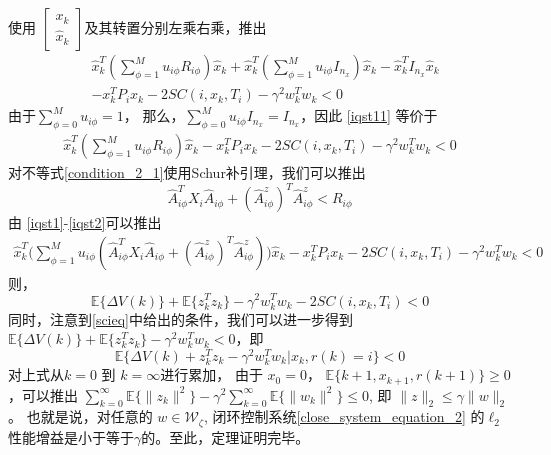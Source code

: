	使用 $\begin{bmatrix}
	x_{k}\\
	\hat{x}_{k}
	\end{bmatrix}$及其转置分别左乘右乘，推出
	\begin{equation} \label{iqst11}
	\begin{split}
	&\hat{x}^{T}_{k}(\sum_{\phi=1}^{M}u_{i\phi}R_{i\phi})\hat{x}_k+ \hat{x}^{T}_{k}(\sum_{\phi=1}^{M}u_{i\phi}I_{n_{x}})\hat{x}_{k}-\hat{x}^{T}_{k}I_{n_{x}}\hat{x}_{k}\\
	&-x^{T}_{k}P_{i}x_{k}-2SC(i,x_k,T_i)-\gamma^{2}w^{T}_{k}w_{k}<0
	\end{split}
	\end{equation}
	由于$\sum_{\phi=0}^{M}u_{i\phi}=1$， 那么，$\sum_{\phi=0}^{M}u_{i\phi}I_{n_x}=I_{n_x}$，因此 \eqref{iqst11} 等价于
	\begin{equation} \label{iqst1}
	\begin{split}
	\hat{x}^{T}_{k}(\sum_{\phi=1}^{M}u_{i\phi}R_{i\phi})\hat{x}_k-x^{T}_{k}P_{i}x_{k}-2SC(i,x_k,T_i)-\gamma^{2}w^{T}_{k}w_{k}<0
	\end{split}
	\end{equation}
	对不等式\eqref{condition_2_1}使用Schur补引理，我们可以推出
	\begin{equation} \label{iqst2}
	\hat{A}^{T}_{i\phi}X_{i}\hat{A}_{i\phi}+(\hat{A}^{z}_{i\phi})^{T}\hat{A}^{z}_{i\phi}<R_{i\phi}
	\end{equation}
	由 \eqref{iqst1}-\eqref{iqst2}可以推出
	\begin{equation} \label{leq222}
	\begin{split}
	\hat{x}^{T}_{k}\Big(\sum_{\phi=1}^{M}u_{i\phi}(\hat{A}^{T}_{i\phi}X_{i}\hat{A}_{i\phi}+(\hat{A}^{z}_{i\phi})^{T}\hat{A}^{z}_{i\phi})\Big)\hat{x}_k-x^{T}_{k}P_{i}x_{k}  -2SC(i,x_k,T_i)-\gamma^{2}w^{T}_{k}w_{k}<0
	\end{split}
	\end{equation}
	则， 
	\begin{equation} \label{eq31}
	\mathbb{E}\{\varDelta V(k)\}+\mathbb{E}\{z^{T}_{k}z_{k}\}-\gamma^{2}w^{T}_{k}w_{k}-2SC(i,x_k,T_i)<0
	\end{equation}
	同时，注意到\eqref{scieq}中给出的条件，我们可以进一步得到$\mathbb{E}\{\varDelta V(k)\}+\mathbb{E}\{z^{T}_{k}z_{k}\}-\gamma^{2}w^{T}_{k}w_{k}<0$，即
	\begin{equation}
	\mathbb{E}\{\varDelta V(k)+z^{T}_{k}z_{k}-\gamma^{2}w^{T}_{k}w_{k}|x_{k},r(k)=i \}<0
	\end{equation}
	对上式从$k=0$ 到 $k=\infty$进行累加， 由于 $x_{0} =0$， $\mathbb{E}\{k+1,x_{k+1},r(k+1)\}\geq0 $，可以推出 $\sum_{k=0}^{\infty}\mathbb{E}\{ \|z_{k}\|^{2} \}-\gamma^{2}\sum_{k=0}^{\infty}\mathbb{E}\{\|w_{k}\|^{2}\}\leq0 $, 即 $\|z\|_{2}\leq\gamma\|w\|_{2}$。 也就是说，对任意的 $w\in \mathcal{W}_{\zeta}$, 闭环控制系统\eqref{close_system_equation_2} 的$\ell_2$性能增益是小于等于$\gamma$的。至此，定理证明完毕。
	
